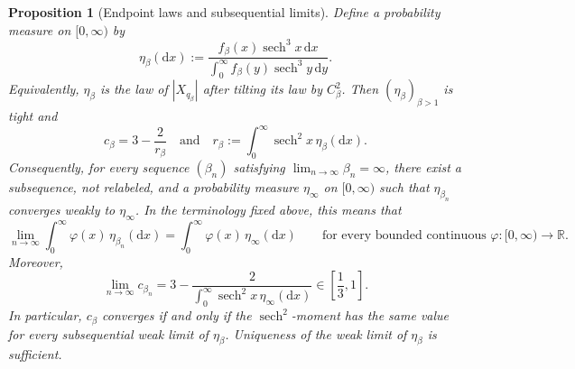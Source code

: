 \documentclass[10pt]{amsart}
\newtheorem{proposition}[proposition]{Proposition}
\theoremstyle{definition}
\theoremstyle{remark}
\numberwithin{equation}{section}
\newcommand{\R}{\mathbb R}
\newcommand{\1}{\mathbf 1}
\newcommand{\sech}{\operatorname{sech}}
\newcommand{\dd}{\,\mathrm d}
\begin{document}
\begin{proposition}[Endpoint laws and subsequential limits]
\label{prop:ft-endpoint-laws}
Define a probability measure on $[0,\infty)$ by
\begin{equation}
 \eta_\beta(\mathrm d x)
 :=\frac{f_\beta(x)\sech^3x\dd x}
        {\int_0^\infty f_\beta(y)\sech^3y\dd y}.
 \label{eq:ft-endpoint-law}
\end{equation}
Equivalently, $\eta_\beta$ is the law of $|X_{q_\beta}|$ after tilting its law by $C_\beta^2$.  Then $(\eta_\beta)_{\beta>1}$ is tight and
\begin{equation}
 c_\beta=3-\frac2{r_\beta}
 \quad\text{and}\quad
 r_\beta:=\int_0^\infty\sech^2x\,\eta_\beta(\mathrm d x).
 \label{eq:ft-c-endpoint-law}
\end{equation}
Consequently, for every sequence $(\beta_n)$ satisfying $\lim_{n\to\infty}\beta_n=\infty$, there exist a subsequence, not relabeled, and a probability measure $\eta_\infty$ on $[0,\infty)$ such that $\eta_{\beta_n}$ converges weakly to $\eta_\infty$.  In the terminology fixed above, this means that
\begin{equation}
 \lim_{n\to\infty}
 \int_0^\infty\varphi(x)\,\eta_{\beta_n}(\mathrm d x)
 =
 \int_0^\infty\varphi(x)\,\eta_\infty(\mathrm d x)
 \qquad\text{for every bounded continuous }
 \varphi:[0,\infty)\to\R.
 \label{eq:ft-eta-subsequential-limit}
\end{equation}
Moreover,
\begin{equation}
 \lim_{n\to\infty}c_{\beta_n}
 =
 3-\frac2{\int_0^\infty\sech^2x\,\eta_\infty(\mathrm d x)}
 \in\left[\frac13,1\right].
 \label{eq:ft-c-subsequential-limit}
\end{equation}
In particular, $c_\beta$ converges if and only if the $\sech^2$-moment has the same value for every subsequential weak limit of $\eta_\beta$. Uniqueness of the weak limit of $\eta_\beta$ is sufficient.
\end{proposition}
\end{document}
